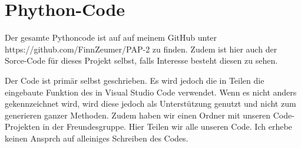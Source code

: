 \chapter{Phython-Code}
\label{ch:Python}


Der gesamte Pythoncode ist auf auf meinem GitHub unter https://github.com/FinnZeumer/PAP-2 \cite{githubPAP2} zu finden. Zudem ist hier auch der Sorce-Code für dieses Projekt selbst, falls Interesse besteht diesen zu sehen.

Der Code ist primär selbst geschrieben. Es wird jedoch die in Teilen die eingebaute Funktion des  in Visual Studio Code verwendet. Wenn es nicht anders gekennzeichnet wird, wird diese jedoch als Unterstützung genutzt und nicht zum generieren ganzer Methoden. 
Zudem haben wir einen Ordner mit unseren Code-Projekten in der Freundesgruppe. Hier Teilen wir alle unseren Code. Ich erhebe keinen Ansprch auf alleiniges Schreiben des Codes.


